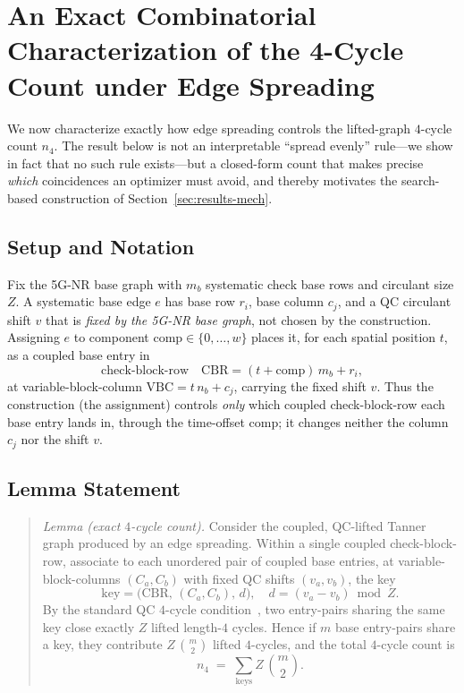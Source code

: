 \documentclass[journal]{IEEEtran}
\begin{document}
\section{An Exact Combinatorial Characterization of the 4-Cycle Count under Edge Spreading}
\label{sec:lemma}
We now characterize exactly how edge spreading controls the lifted-graph
$4$-cycle count $n_4$. The result below is not an interpretable ``spread evenly''
rule---we show in fact that no such rule exists---but a closed-form count that
makes precise \emph{which} coincidences an optimizer must avoid, and thereby
motivates the search-based construction of Section~\ref{sec:results-mech}.

\subsection{Setup and Notation}
Fix the 5G-NR base graph with $m_b$ systematic check base rows and circulant
size $Z$. A systematic base edge $e$ has base row $r_i$, base column $c_j$, and a
QC circulant shift $v$ that is \emph{fixed by the 5G-NR base graph}, not chosen by
the construction. Assigning $e$ to component $\mathrm{comp}\in\{0,\dots,w\}$
places it, for each spatial position $t$, as a coupled base entry in
\begin{equation}
\text{check-block-row}\quad \mathrm{CBR} = (t+\mathrm{comp})\,m_b + r_i,
\label{eq:cbr}
\end{equation}
at variable-block-column $\mathrm{VBC}=t\,n_b+c_j$, carrying the fixed shift $v$.
Thus the construction (the assignment) controls \emph{only} which coupled
check-block-row each base entry lands in, through the time-offset
$\mathrm{comp}$; it changes neither the column $c_j$ nor the shift $v$.

\subsection{Lemma Statement}
\begin{quote}
\emph{Lemma (exact $4$-cycle count).} Consider the coupled, QC-lifted Tanner
graph produced by an edge spreading. Within a single coupled check-block-row,
associate to each unordered pair of coupled base entries, at variable-block-columns
$(C_a,C_b)$ with fixed QC shifts $(v_a,v_b)$, the key
\begin{equation}
\mathrm{key} = \bigl(\mathrm{CBR},\, (C_a,C_b),\, d\bigr),
\quad d=(v_a-v_b)\bmod Z .
\label{eq:key}
\end{equation}
By the standard QC $4$-cycle condition~\cite{fossorier2004qc}, two entry-pairs
sharing the same key close exactly $Z$ lifted length-$4$ cycles. Hence if $m$
base entry-pairs share a key, they contribute $Z\,\binom{m}{2}$ lifted
$4$-cycles, and the total $4$-cycle count is
\begin{equation}
n_4 \;=\; \sum_{\mathrm{keys}} Z\,\binom{m}{2}.
\label{eq:n4}
\end{equation}
\end{quote}
\end{document}
